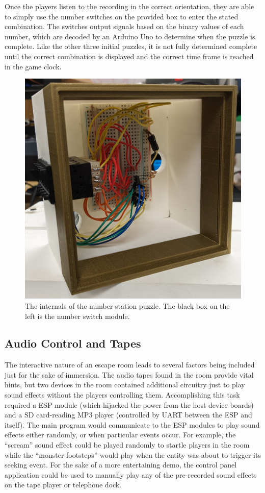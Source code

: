 \documentclass[conference]{IEEEtran}
\begin{document}
\indent Once the players listen to the recording in the correct orientation, they are able to simply use the number 
switches on the provided box to enter the stated combination. The switches output signals based on the binary values 
of each number, which are decoded by an Arduino Uno to determine when the puzzle is complete. Like the other three initial 
puzzles, it is not fully determined complete until the correct combination is displayed and the correct time frame is reached 
in the game clock.

\begin{figure}[ht]
    \centering
    \includegraphics[width=0.90\columnwidth]{Images/num_puzzle.jpg}
    \caption{The internals of the number station puzzle. The black box on the left is the number switch module.}
\end{figure}


\subsection{Audio Control and Tapes} %
\indent The interactive nature of an escape room leads to several factors being included just for the sake of immersion. 
The audio tapes found in the room provide vital hints, but two devices in the room contained additional circuitry 
just to play sound effects without the players controlling them. Accomplishing this task required a ESP module (which 
hijacked the power from the host device boards) and a SD card-reading MP3 player (controlled by UART between the ESP and 
itself). The main program would communicate to the ESP modules to play sound effects either randomly, or when particular 
events occur. For example, the ``scream'' sound effect could be played randomly to startle players in the room while the 
``monster footsteps'' would play when the entity was about to trigger its seeking event. For the sake of a more entertaining 
demo, the control panel application could be used to manually play any of the pre-recorded sound effects on the tape player 
or telephone dock.
\end{document}
